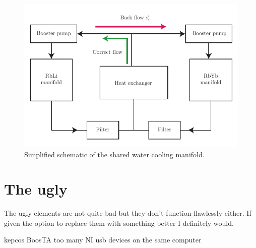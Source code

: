 \begin{figure}[htb]
\begin{center}
\includegraphics[]{Figures/Chapter4/water_cooling.pdf}
\caption[Water cooling manifold schematic]{Simplified schematic of the shared water cooling manifold.}
\label{fig:water_cooling}
\end{center}
\end{figure}

\section{The ugly}
The ugly elements are not quite bad but they don't function flawlessly either. If given the option to replace them with something better I definitely would. 

kepcos
BoosTA
too many NI usb devices on the same computer


 